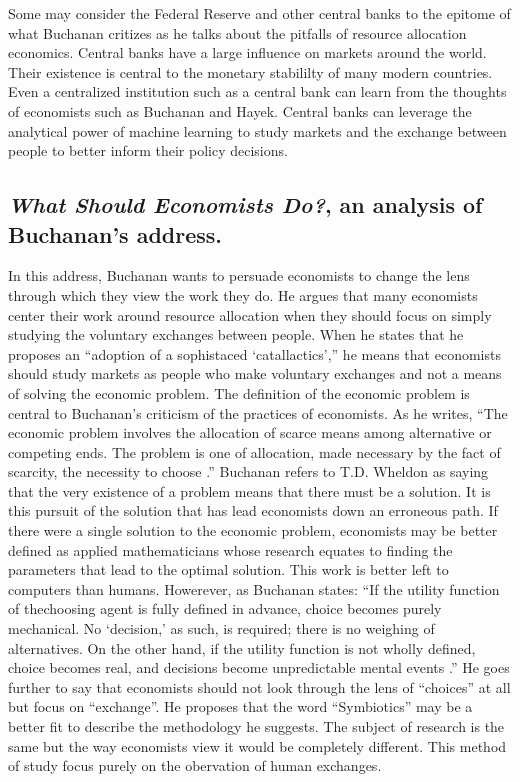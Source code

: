 \documentclass[11pt,]{article}
\begin{document}
Some may consider the Federal Reserve and other central banks to the
epitome of what Buchanan critizes as he talks about the pitfalls of
resource allocation economics. Central banks have a large influence on
markets around the world. Their existence is central to the monetary
stabililty of many modern countries. Even a centralized institution such
as a central bank can learn from the thoughts of economists such as
Buchanan and Hayek. Central banks can leverage the analytical power of
machine learning to study markets and the exchange between people to
better inform their policy decisions.

\subsection{\texorpdfstring{\emph{What Should Economists Do?}, an
analysis of Buchanan's
address.}{What Should Economists Do?, an analysis of Buchanan's address.}}\label{what-should-economists-do-an-analysis-of-buchanans-address.}

In this address, Buchanan wants to persuade economists to change the
lens through which they view the work they do. He argues that many
economists center their work around resource allocation when they should
focus on simply studying the voluntary exchanges between people. When he
states that he proposes an ``adoption of a sophistaced `catallactics',''
he means that economists should study markets as people who make
voluntary exchanges and not a means of solving the economic problem. The
definition of the economic problem is central to Buchanan's criticism of
the practices of economists. As he writes, ``The economic problem
involves the allocation of scarce means among alternative or competing
ends. The problem is one of allocation, made necessary by the fact of
scarcity, the necessity to choose \citet{buchanan1964}.'' Buchanan
refers to T.D. Wheldon as saying that the very existence of a problem
means that there must be a solution. It is this pursuit of the solution
that has lead economists down an erroneous path. If there were a single
solution to the economic problem, economists may be better defined as
applied mathematicians whose research equates to finding the parameters
that lead to the optimal solution. This work is better left to computers
than humans. Howerever, as Buchanan states: ``If the utility function of
thechoosing agent is fully defined in advance, choice becomes purely
mechanical. No `decision,' as such, is required; there is no weighing of
alternatives. On the other hand, if the utility function is not wholly
defined, choice becomes real, and decisions become unpredictable mental
events \citet{buchanan1964}.'' He goes further to say that economists
should not look through the lens of ``choices'' at all but focus on
``exchange''. He proposes that the word ``Symbiotics'' may be a better
fit to describe the methodology he suggests. The subject of research is
the same but the way economists view it would be completely different.
This method of study focus purely on the obervation of human exchanges.
\end{document}
